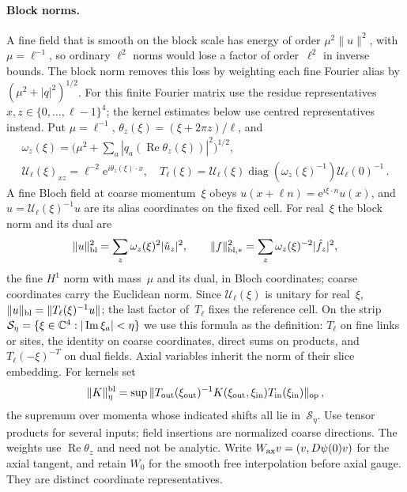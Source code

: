 \paragraph{Block norms.}
A fine field that is smooth on the block scale has energy of order $\mu^2\|u\|^2$, with $\mu=\ell^{-1}$, so ordinary $\ell^2$ norms would lose a factor of order~$\ell^2$ in inverse bounds. The block norm removes this loss by weighting each fine Fourier alias by $(\mu^2+|q|^2)^{1/2}$. For this finite Fourier matrix use the residue representatives $x,z\in\{0,\ldots,\ell-1\}^4$; the kernel estimates below use centred representatives instead. Put $\mu=\ell^{-1}$, $\theta_z(\xi)=(\xi+2\pi z)/\ell$, and
\begin{gather*}
\omega_z(\xi)=\bigl(\mu^2+\sum_a|q_a(\operatorname{Re}\theta_z(\xi))|^2\bigr)^{1/2},\\
\mathcal U_\ell(\xi)_{xz}=\ell^{-2}\mathrm e^{i\theta_z(\xi)\cdot x},\quad
T_\ell(\xi)=\mathcal U_\ell(\xi)\operatorname{diag}(\omega_z(\xi)^{-1})\mathcal U_\ell(0)^{-1}\,.
\end{gather*}
A fine Bloch field at coarse momentum~$\xi$ obeys $u(x+\ell n)=\mathrm e^{i\xi\cdot n}u(x)$, and $\hat u=\mathcal U_\ell(\xi)^{-1}u$ are its alias coordinates on the fixed cell. For real~$\xi$ the block norm and its dual are
\begin{equation*}
\|u\|_{\rm bl}^2=\sum_z\omega_z(\xi)^2|\hat u_z|^2,\qquad
\|f\|_{{\rm bl},*}^2=\sum_z\omega_z(\xi)^{-2}|\hat f_z|^2,
\end{equation*}
the fine $H^1$ norm with mass~$\mu$ and its dual, in Bloch coordinates; coarse coordinates carry the Euclidean norm. Since $\mathcal U_\ell(\xi)$ is unitary for real~$\xi$, $\|u\|_{\rm bl}=\|T_\ell(\xi)^{-1}u\|$; the last factor of~$T_\ell$ fixes the reference cell. On the strip $\mathcal S_\eta=\{\xi\in\mathbb{C}^4:|\operatorname{Im}\xi_a|<\eta\}$ we use this formula as the definition: $T_\ell$ on fine links or sites, the identity on coarse coordinates, direct sums on products, and $T_\ell(-\xi)^{-T}$ on dual fields. Axial variables inherit the norm of their slice embedding. For kernels set
\begin{equation*}
\|K\|_\eta^{\rm bl}=\sup\|T_{\rm out}(\xi_{\rm out})^{-1}K(\xi_{\rm out},\xi_{\rm in})T_{\rm in}(\xi_{\rm in})\|_{\rm op}\,,
\end{equation*}
the supremum over momenta whose indicated shifts all lie in~$\mathcal S_\eta$. Use tensor products for several inputs; field insertions are normalized coarse directions. The weights use $\operatorname{Re}\theta_z$ and need not be analytic. Write $W_{\rm ax}v=(v,D\psi(0)v)$ for the axial tangent, and retain $W_0$ for the smooth free interpolation before axial gauge. They are distinct coordinate representatives.

